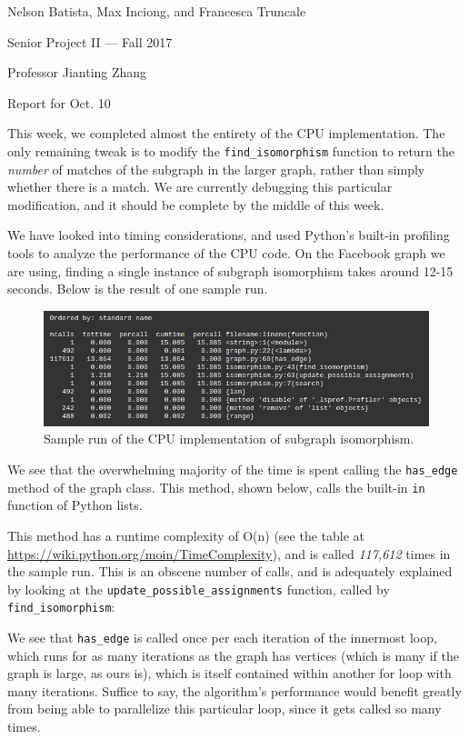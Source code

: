 \documentclass{article}
\begin{document}
\noindent Nelson Batista, Max Inciong, and Francesca Truncale

\noindent Senior Project II --- Fall 2017

\noindent Professor Jianting Zhang

\noindent Report for Oct. 10

This week, we completed almost the entirety of the CPU implementation. The only remaining tweak is to modify the \texttt{find\_isomorphism} function to return the \textit{number} of matches of the subgraph in the larger graph, rather than simply whether there is a match. We are currently debugging this particular modification, and it should be complete by the middle of this week.

We have looked into timing considerations, and used Python's built-in profiling tools to analyze the performance of the CPU code. On the Facebook graph we are using, finding a single instance of subgraph isomorphism takes around 12-15 seconds. Below is the result of one sample run.

\begin{figure}[H]
  \centering
  \includegraphics[scale=0.6]{perf}
  \caption{Sample run of the CPU implementation of subgraph isomorphism.}
\end{figure}

We see that the overwhelming majority of the time is spent calling the \texttt{has\_edge} method of the graph class. This method, shown below, calls the built-in \texttt{in} function of Python lists. 



This method has a runtime complexity of O(n) (see the table at \url{https://wiki.python.org/moin/TimeComplexity}), and is called \textit{117,612} times in the sample run. This is an obscene number of calls, and is adequately explained by looking at the \texttt{update\_possible\_assignments} function, called by \texttt{find\_isomorphism}:



We see that \texttt{has\_edge} is called once per each iteration of the innermost loop, which runs for as many iterations as the graph has vertices (which is many if the graph is large, as ours is), which is itself contained within another for loop with many iterations. Suffice to say, the algorithm's performance would benefit greatly from being able to parallelize this particular loop, since it gets called so many times.
\end{document}
